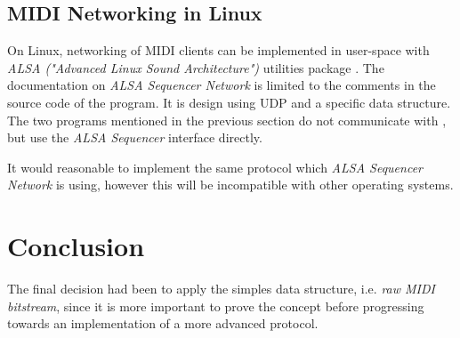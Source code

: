 \subsection{MIDI Networking in Linux}

  On Linux, networking of MIDI clients can be implemented in user-space
 with \emph{ALSA ("Advanced Linux Sound Architecture")} utilities package
 \cite{links:linux:alsa}.
 The documentation on \emph{ALSA Sequencer Network} is limited to the
 comments in the source code of the  program. It is design
 using UDP and a specific data structure. The two programs mentioned in
 the previous section do not communicate with , but use
 the \emph{ALSA Sequencer} interface directly.

  It would reasonable to implement the same protocol which \emph{ALSA
 Sequencer Network} is using, however this will be incompatible with
 other operating systems.

\section{Conclusion}

  The final decision had been to apply the simples data structure, i.e.
 \emph{raw MIDI bitstream}, since it is more important to prove the concept
 before progressing towards an implementation of a more advanced protocol.

